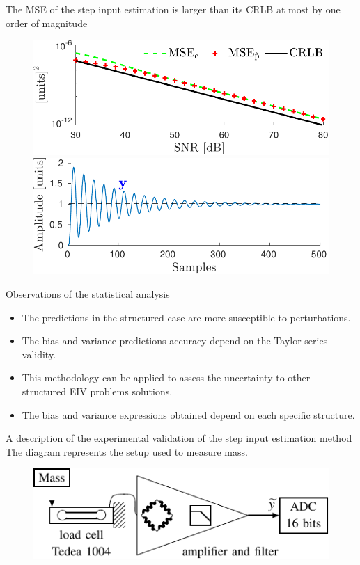\documentclass[presentation]{beamer}
\begin{document}
\begin{frame}[label={slide:statistical10}]{The MSE of the step input estimation is larger than its CRLB at most by one order of magnitude}
\begin{figure}[htb!]
\centering
\includegraphics[width=0.55\columnwidth]{./fig/Stat_Fig_3.pdf} 
\includegraphics[width=0.55\columnwidth]{./fig/Stat_Fig_4.pdf} 
\end{figure}
\end{frame}

\begin{frame}[label={slide:statistical11}]{Observations of the statistical analysis}
\begin{itemize}
\item The predictions in the structured case are more susceptible to perturbations.
\item The bias and variance predictions accuracy depend on the Taylor series validity.
\item This methodology can be applied to assess the uncertainty to other structured EIV problems solutions.
\item The bias and variance expressions obtained depend on each specific structure.
\end{itemize}
\end{frame}

\begin{frame}[label={slide:experimental-validation1}]{A description of the experimental validation of the step input estimation method}
The diagram represents the setup used to measure mass. 
\begin{figure}[htb!]
\centering
\includegraphics[width=0.55\columnwidth]{./fig/Exp_Fig_5.pdf} 
\end{figure}
\end{frame}
\end{document}
